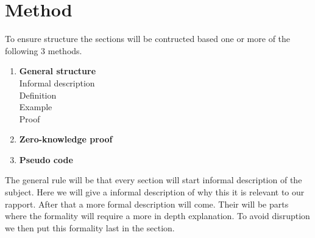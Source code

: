 \section{Method}
To ensure structure the sections will be contructed based one or more of the following 3 methods.
\begin{enumerate}
    \item \textbf{General structure}  \\
    Informal description\\
    Definition\\
    Example\\
    Proof    
    \item \textbf{Zero-knowledge proof}
    \item \textbf{Pseudo code} 
\end{enumerate}

 The general rule will be that every section will start informal description of the subject. Here we will give a informal description of why this it is relevant to our rapport. After that a more formal description will come. Their will be parts where the formality will require a more in depth explanation. To avoid disruption we then put this formality last in the section.    


